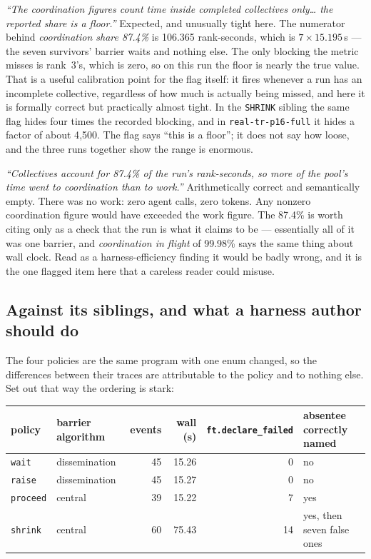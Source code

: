 \documentclass[11pt]{article}
\begin{document}
\emph{``The coordination figures count time inside \emph{completed} collectives only\ldots
the reported share is a floor.''} Expected, and unusually tight here. The numerator behind
\emph{coordination share 87.4\%} is 106.365 rank-seconds, which is $7 \times 15.195$\,s
--- the seven survivors' barrier waits and nothing else. The only blocking the metric
misses is rank~3's, which is zero, so on this run the floor is nearly the true value.
That is a useful calibration point for the flag itself: it fires whenever a run has an
incomplete collective, regardless of how much is actually being missed, and here it is
formally correct but practically almost tight. In the \texttt{SHRINK} sibling the same
flag hides four times the recorded blocking, and in \texttt{real-tr-p16-full} it hides a
factor of about 4{,}500. The flag says ``this is a floor''; it does not say how loose, and
the three runs together show the range is enormous.

\emph{``Collectives account for 87.4\% of the run's rank-seconds, so more of the pool's
time went to coordination than to work.''} Arithmetically correct and semantically empty.
There was no work: zero agent calls, zero tokens. Any nonzero coordination figure would
have exceeded the work figure. The 87.4\% is worth citing only as a check that the run is
what it claims to be --- essentially all of it was one barrier, and
\emph{coordination in flight} of 99.98\% says the same thing about wall clock. Read as a
harness-efficiency finding it would be badly wrong, and it is the one flagged item here
that a careless reader could misuse.

\subsection{Against its siblings, and what a harness author should do}

The four policies are the same program with one enum changed, so the differences between
their traces are attributable to the policy and to nothing else. Set out that way the
ordering is stark:

\begin{center}\footnotesize
\begin{tabular}{@{}llrrrl@{}}
\toprule
policy & barrier algorithm & events & wall (s) & \texttt{ft.declare\_failed} & absentee correctly named \\
\midrule
\texttt{wait}    & dissemination & 45 & 15.26 & 0  & no \\
\texttt{raise}   & dissemination & 45 & 15.27 & 0  & no \\
\texttt{proceed} & central       & 39 & 15.22 & 7  & yes \\
\texttt{shrink}  & central       & 60 & 75.43 & 14 & yes, then seven false ones \\
\bottomrule
\end{tabular}\normalsize
\end{center}
\end{document}
